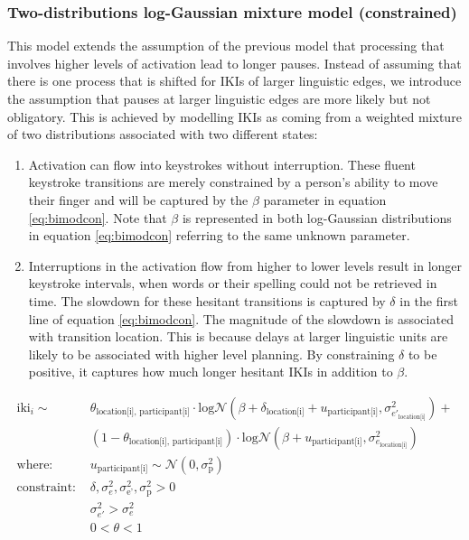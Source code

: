 \documentclass[
  man,floatsintext]{apa7}
\begin{document}
\hypertarget{two-distributions-log-gaussian-mixture-model-constrained}{%
\subsubsection{Two-distributions log-Gaussian mixture model (constrained)}\label{two-distributions-log-gaussian-mixture-model-constrained}}

This model extends the assumption of the previous model that processing that involves higher levels of activation lead to longer pauses. Instead of assuming that there is one process that is shifted for IKIs of larger linguistic edges, we introduce the assumption that pauses at larger linguistic edges are more likely but not obligatory. This is achieved by modelling IKIs as coming from a weighted mixture of two distributions associated with two different states:

\begin{enumerate}
\def\labelenumi{\arabic{enumi}.}
\item
  Activation can flow into keystrokes without interruption. These fluent keystroke transitions are merely constrained by a person's ability to move their finger and will be captured by the \(\beta\) parameter in equation \ref{eq:bimodcon}. Note that \(\beta\) is represented in both log-Gaussian distributions in equation \ref{eq:bimodcon} referring to the same unknown parameter.
\item
  Interruptions in the activation flow from higher to lower levels result in longer keystroke intervals, when words or their spelling could not be retrieved in time. The slowdown for these hesitant transitions is captured by \(\delta\) in the first line of equation \ref{eq:bimodcon}. The magnitude of the slowdown is associated with transition location. This is because delays at larger linguistic units are likely to be associated with higher level planning. By constraining \(\delta\) to be positive, it captures how much longer hesitant IKIs in addition to \(\beta\).
\end{enumerate}

\begin{equation}
\begin{aligned}
\label{eq:bimodcon}
\text{iki}_{i} \sim\text{ } & \theta_\text{location[i], participant[i]} \cdot \text{log}\mathcal{N}(\beta + \delta_\text{location[i]} + u_\text{participant[i]}, \sigma_{e'_\text{location[i]}}^2) + \\
  & (1 - \theta_\text{location[i], participant[i]}) \cdot \text{log}\mathcal{N}(\beta + u_\text{participant[i]}, \sigma_{e_\text{location[i]}}^2)\\
\text{where: } & u_\text{participant[i]} \sim \mathcal{N}(0, \sigma_\text{p}^2) \\
\text{constraint: } & \delta, \sigma_{e}^2, \sigma_\text{e'}^2, \sigma_\text{p}^2>0\\
        & \sigma_{e'}^2 > \sigma_{e}^2\\
        & 0 < \theta < 1
\end{aligned}
\end{equation}
\end{document}
